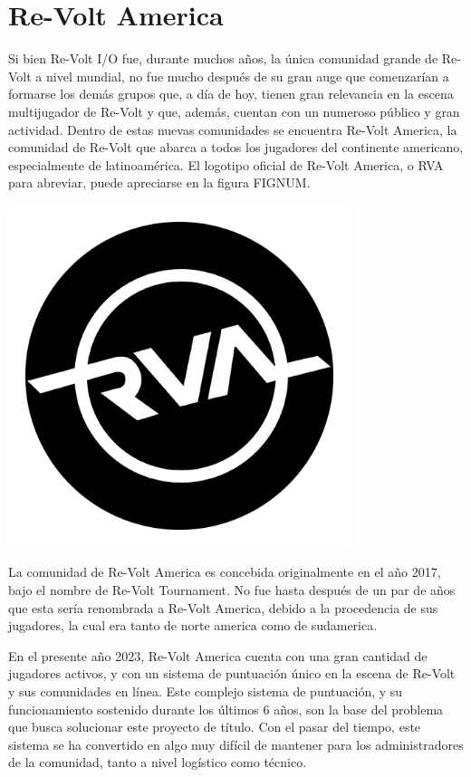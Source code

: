 \section{Re-Volt America}
Si bien Re-Volt I/O fue, durante muchos años, la única comunidad grande de Re-Volt a nivel mundial, no fue mucho después de su gran auge que comenzarían a formarse los demás grupos que, a día de hoy, tienen gran relevancia en la escena multijugador de Re-Volt y que, además, cuentan con un numeroso público y gran actividad. Dentro de estas nuevas comunidades se encuentra Re-Volt America, la comunidad de Re-Volt que abarca a todos los jugadores del continente americano, especialmente de latinoamérica. El logotipo oficial de Re-Volt America, o RVA para abreviar, puede apreciarse en la figura FIGNUM.

\includegraphics[width=10cm, height=10cm]{img/rva.png}

La comunidad de Re-Volt America es concebida originalmente en el año 2017, bajo el nombre de Re-Volt Tournament. No fue hasta después de un par de años que esta sería renombrada a Re-Volt America, debido a la procedencia de sus jugadores, la cual era tanto de norte america como de sudamerica.

En el presente año 2023, Re-Volt America cuenta con una gran cantidad de jugadores activos, y con un sistema de puntuación único en la escena de Re-Volt y sus comunidades en línea. Este complejo sistema de puntuación, y su funcionamiento sostenido durante los últimos 6 años, son la base del problema que busca solucionar este proyecto de título. Con el pasar del tiempo, este sistema se ha convertido en algo muy difícil de mantener para los administradores de la comunidad, tanto a nivel logístico como técnico.

